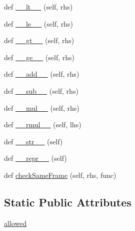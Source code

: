 \begin{DoxyCompactItemize}
def \hyperlink{classmatplotlib_1_1testing_1_1jpl__units_1_1Duration_1_1Duration_a4b3d0b301f5b52073b2ec86998d8f401}{\+\_\+\+\_\+lt\+\_\+\+\_\+} (self, rhs)
\item 
def \hyperlink{classmatplotlib_1_1testing_1_1jpl__units_1_1Duration_1_1Duration_a66bd94142b439c36fdbc6ef3f19d8392}{\+\_\+\+\_\+le\+\_\+\+\_\+} (self, rhs)
\item 
def \hyperlink{classmatplotlib_1_1testing_1_1jpl__units_1_1Duration_1_1Duration_ae8c7899368da0c928b8cb8e924bfc47e}{\+\_\+\+\_\+gt\+\_\+\+\_\+} (self, rhs)
\item 
def \hyperlink{classmatplotlib_1_1testing_1_1jpl__units_1_1Duration_1_1Duration_a1294f12a376548975c2832e63cfd3c3b}{\+\_\+\+\_\+ge\+\_\+\+\_\+} (self, rhs)
\item 
def \hyperlink{classmatplotlib_1_1testing_1_1jpl__units_1_1Duration_1_1Duration_a5438cb5564d66d1fdd5f71fa2df0e7ac}{\+\_\+\+\_\+add\+\_\+\+\_\+} (self, rhs)
\item 
def \hyperlink{classmatplotlib_1_1testing_1_1jpl__units_1_1Duration_1_1Duration_aaf67be870e5ba53f47b0bd26a2cb6770}{\+\_\+\+\_\+sub\+\_\+\+\_\+} (self, rhs)
\item 
def \hyperlink{classmatplotlib_1_1testing_1_1jpl__units_1_1Duration_1_1Duration_adf8cf0869c75f5de4f9574c9f5492c35}{\+\_\+\+\_\+mul\+\_\+\+\_\+} (self, rhs)
\item 
def \hyperlink{classmatplotlib_1_1testing_1_1jpl__units_1_1Duration_1_1Duration_acb83e39194c7dcec59355620245fbcba}{\+\_\+\+\_\+rmul\+\_\+\+\_\+} (self, lhs)
\item 
def \hyperlink{classmatplotlib_1_1testing_1_1jpl__units_1_1Duration_1_1Duration_a744cc7fe3ad612894ba29af237f0dae3}{\+\_\+\+\_\+str\+\_\+\+\_\+} (self)
\item 
def \hyperlink{classmatplotlib_1_1testing_1_1jpl__units_1_1Duration_1_1Duration_a466f6e0ea763e57794b1bfb83b279d0c}{\+\_\+\+\_\+repr\+\_\+\+\_\+} (self)
\item 
def \hyperlink{classmatplotlib_1_1testing_1_1jpl__units_1_1Duration_1_1Duration_acc89581e64503edf9c5743f8480fc2ec}{check\+Same\+Frame} (self, rhs, func)
\end{DoxyCompactItemize}
\subsection*{Static Public Attributes}
\begin{DoxyCompactItemize}
\item 
\hyperlink{classmatplotlib_1_1testing_1_1jpl__units_1_1Duration_1_1Duration_ab0114bb00527a0a190dc32fd518ee02b}{allowed}
\end{DoxyCompactItemize}



